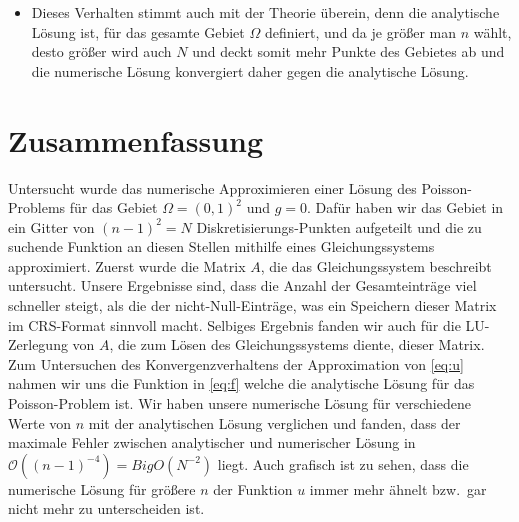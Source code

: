 \documentclass{scrartcl}
\newcommand\BigO{\mathcal{O}}
\begin{document}
\begin{itemize}
    \item Dieses Verhalten stimmt auch mit der Theorie überein, denn die
          analytische Lösung ist, für das gesamte Gebiet \(\Omega\) definiert,
          und da je größer man \(n\) wählt, desto größer wird auch \(N\) und deckt 
          somit mehr Punkte des Gebietes ab und die numerische Lösung konvergiert
          daher gegen die analytische Lösung.
\end{itemize}

\section{Zusammenfassung}

Untersucht wurde das numerische Approximieren einer Lösung des Poisson-Problems
für das Gebiet \(\Omega = {(0, 1)}^2\) und \(g = 0\). Dafür haben wir das
Gebiet in ein Gitter von \({(n - 1)}^2 = N\) Diskretisierungs-Punkten aufgeteilt
und die zu suchende Funktion an diesen Stellen mithilfe eines Gleichungssystems
approximiert. Zuerst wurde die Matrix \(A\), die das Gleichungssystem
beschreibt untersucht. Unsere Ergebnisse sind, dass die Anzahl der
Gesamteinträge viel schneller steigt, als die der nicht-Null-Einträge, was ein
Speichern dieser Matrix im CRS-Format sinnvoll macht. Selbiges Ergebnis fanden
wir auch für die LU-Zerlegung von \(A\), die zum Lösen des Gleichungssystems
diente, dieser Matrix. Zum Untersuchen des Konvergenzverhaltens der
Approximation von \autoref{eq:u} nahmen wir uns die Funktion in \autoref{eq:f}
welche die analytische Lösung für das Poisson-Problem ist. Wir haben unsere
numerische Lösung für verschiedene Werte von \(n\) mit der analytischen Lösung
verglichen und fanden, dass der maximale Fehler zwischen analytischer und
numerischer Lösung in \(\BigO({(n - 1)}^{-4}) = BigO(N^{-2})\) liegt. Auch grafisch ist zu
sehen, dass die numerische Lösung für größere \(n\) der Funktion \(u\) immer
mehr ähnelt bzw.\ gar nicht mehr zu unterscheiden ist.

\printbibliography%
\end{document}
